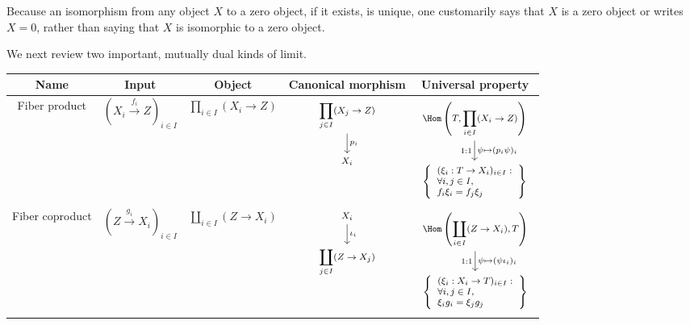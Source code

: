 Because an isomorphism from any object $X$ to a zero object, if it exists, is unique, one customarily says that $X$ is a zero object or writes $X=0$, rather than saying that $X$ is isomorphic to a zero object.

We next review two important, mutually dual kinds of limit.

\begin{center}\small\setlength{\tabcolsep}{2.5pt}\begin{tabular}{|c|c|c|c|c|} \hline
	Name & Input & Object & Canonical morphism & Universal property \\ \hline
	Fiber product & $\left( X_i \xrightarrow{f_i} Z \right)_{i \in I}$ & $\displaystyle\prod_{i \in I} (X_i \to Z)$ & $\begin{tikzcd}[every cell/.append style={font = \footnotesize}] \displaystyle\prod_{j \in I} (X_j \to Z) \arrow[d, "p_i"] \\ X_i \end{tikzcd}$ & $\begin{tikzcd}[every cell/.append style={font = \footnotesize}]
		\Hom\left(T, \displaystyle\prod_{i \in I} (X_i \to Z) \right) \arrow[d, "1:1"', "{\psi \mapsto (p_i \psi)_i}"] \\
		\left\{\begin{array}{l} (\xi_i: T \to X_i)_{i \in I}: \\ \forall i,j \in I, \\ f_i \xi_i = f_j \xi_j \end{array}\right\}
	\end{tikzcd}$ \\
	Fiber coproduct & $\left( Z \xrightarrow{g_i} X_i \right)_{i \in I}$ & $\displaystyle\coprod_{i \in I} (Z \to X_i)$ & $\begin{tikzcd}[every cell/.append style={font = \footnotesize}] X_i \arrow[d, "\iota_i"] \\ \displaystyle\coprod_{j \in I} (Z \to X_j) \end{tikzcd}$ & $\begin{tikzcd}[every cell/.append style={font = \footnotesize}]
		\Hom\left(\displaystyle\coprod_{i \in I} (Z \to X_i), T \right) \arrow[d, "1:1"', "{\psi \mapsto (\psi \iota_i)_i}"] \\
		\left\{\begin{array}{l} (\xi_i: X_i \to T)_{i \in I}: \\ \forall i,j \in I, \\ \xi_i g_i = \xi_j g_j \end{array}\right\}
	\end{tikzcd}$ \\ \hline
\end{tabular}\end{center}

